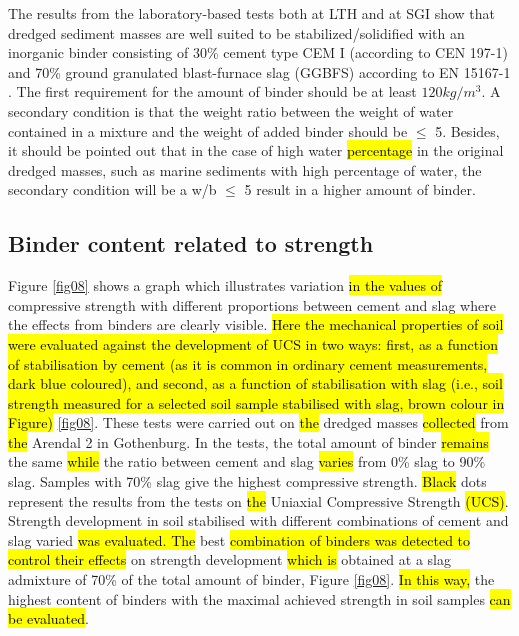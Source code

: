 \documentclass[sustainability,article,submit,pdftex,moreauthors]{Definitions/mdpi}
\begin{document}
The results from the laboratory-based tests both at LTH and at SGI show that dredged sediment masses are well suited to be stabilized/solidified with an inorganic binder consisting of 30\% cement type CEM I (according to CEN 197-1) and 70\% ground granulated blast-furnace slag (GGBFS) according to EN 15167-1 \cite{SIS2006}. The first requirement for the amount of binder should be at least $120 kg/m^3$. A secondary condition is that the weight ratio between the weight of water contained in a mixture and the weight of added binder should be $\leq$ 5. Besides, it should be pointed out that in the case of high water\hl{ percentage }in the original dredged masses, such as marine sediments with high percentage of water, the secondary condition will be a w/b $\leq$ 5 result in a higher amount of binder.

\subsection{Binder content related to strength}
Figure \ref{fig08} shows a graph which illustrates\hl{ }variation \hl{in the values of} compressive strength with different proportions between cement and slag where the effects from binders are clearly visible. \hl{
Here the mechanical properties of soil were evaluated against the development of UCS in two ways: first, as a function of stabilisation by cement (as it is common in ordinary cement measurements, dark blue coloured), and second, as a function of stabilisation with slag (i.e., soil strength measured for a selected soil sample stabilised with slag, brown colour in Figure)}  \ref{fig08}. These tests were carried out on \hl{the }dredged masses \hl{collected }from \hl{the }Arendal 2 in Gothenburg. In the tests, the total amount of binder \hl{remains} the same \hl{while} the ratio between cement and slag \hl{varies} from 0\% slag to 90\% slag. Samples with 70\% slag give the highest compressive strength. \hl{Black} dots represent the results from the tests on \hl{the }Uniaxial Compressive Strength \hl{(UCS)}. Strength development in soil stabilised with different combinations of cement and slag varied \hl{was evaluated. The}  best \hl{combination of binders was detected to control their effects }on strength development \hl{which is} obtained at a slag admixture of 70\% of the total amount of binder, Figure \ref{fig08}. \hl{In this way,} the highest content of binders with the maximal achieved strength in soil samples \hl{can be evaluated}.
\end{document}
